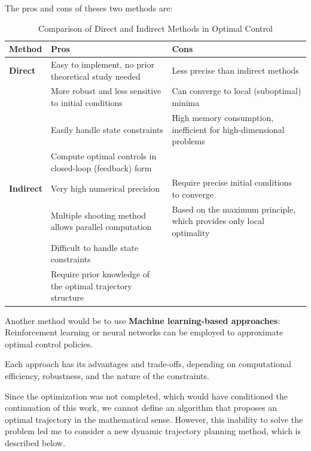 \documentclass[../main.tex]{subfiles}
\begin{document}
The pros and cons of theses two methods are\cite{trelat_2008}:

\begin{table}[H]
    \centering
    \begin{tabular}{l p{7cm} p{7cm} }
        \hline
        \textbf{Method} & \textbf{Pros} & \textbf{Cons} \\
        \hline
        \textbf{Direct} & Easy to implement, no prior theoretical study needed & Less precise than indirect methods\\
        & More robust and less sensitive to initial conditions & Can converge to local (suboptimal) minima\\
		& Easily handle state constraints & High memory consumption, inefficient for high-dimensional problems \\
        & Compute optimal controls in closed-loop (feedback) form & \\
        \hline
        \textbf{Indirect} & Very high numerical precision & Require precise initial conditions to converge\\
        & Multiple shooting method allows parallel computation & Based on the maximum principle, which provides only local optimality\\
		& Difficult to handle state constraints & \\
        & Require prior knowledge of the optimal trajectory structure & \\
        \hline
    \end{tabular}
    \caption{Comparison of Direct and Indirect Methods in Optimal Control}
    \label{tab:methods_comparison}
\end{table}

Another method would be to use \textbf{Machine learning-based approaches}: Reinforcement learning or neural networks can be employed to approximate optimal control policies. 

\vspace{0.5em}

Each approach has its advantages and trade-offs, depending on computational efficiency, robustness, and the nature of the constraints.  

\vspace{0.5em}

Since the optimization was not completed, which would have conditioned the continuation of this work, we cannot define an algorithm that proposes an optimal trajectory in the mathematical sense. However, this inability to solve the problem led me to consider a new dynamic trajectory planning method, which is described below.
\end{document}
